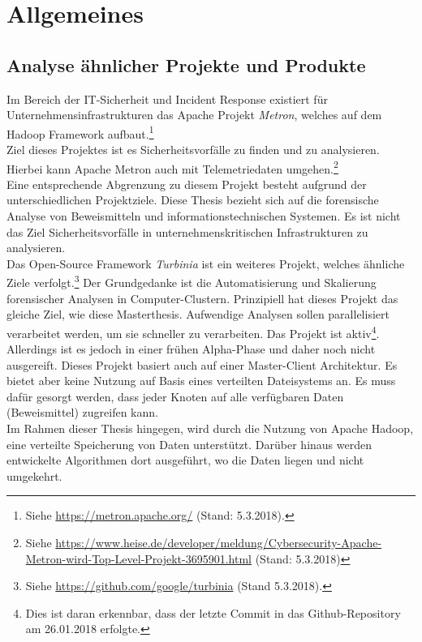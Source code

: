 \chapter{Allgemeines}

\section{Analyse ähnlicher Projekte und Produkte}
Im Bereich der IT-Sicherheit und Incident Response existiert für Unternehmensinfrastrukturen das Apache Projekt \textit{Metron}, welches auf dem Hadoop Framework aufbaut.\footnote{Siehe \url{https://metron.apache.org/} (Stand: 5.3.2018).}\\ Ziel dieses Projektes ist es Sicherheitsvorfälle zu finden und zu analysieren. Hierbei kann Apache Metron auch mit Telemetriedaten umgehen.\footnote{Siehe \url{https://www.heise.de/developer/meldung/Cybersecurity-Apache-Metron-wird-Top-Level-Projekt-3695901.html} (Stand: 5.3.2018)}\\
Eine entsprechende Abgrenzung zu diesem Projekt besteht aufgrund der unterschiedlichen Projektziele. Diese Thesis bezieht sich auf die forensische Analyse von Beweismitteln und informationstechnischen Systemen. Es ist nicht das Ziel Sicherheitsvorfälle in unternehmenskritischen Infrastrukturen zu analysieren.\\

\noindent
Das Open-Source Framework \textit{Turbinia} ist ein weiteres Projekt, welches ähnliche Ziele verfolgt.\footnote{Siehe \url{https://github.com/google/turbinia} (Stand 5.3.2018).}
Der Grundgedanke ist die Automatisierung und Skalierung forensischer Analysen in Computer-Clustern. Prinzipiell hat dieses Projekt das gleiche Ziel, wie diese Masterthesis. Aufwendige Analysen sollen parallelisiert  verarbeitet werden, um sie schneller zu verarbeiten. Das Projekt ist aktiv\footnote{Dies ist daran erkennbar, dass der letzte Commit in das Github-Repository am 26.01.2018 erfolgte.}. 
Allerdings ist es jedoch in einer frühen Alpha-Phase und daher noch nicht ausgereift. Dieses Projekt basiert auch auf einer Master-Client Architektur. Es bietet aber keine Nutzung auf Basis eines verteilten Dateisystems an. Es muss dafür gesorgt werden, dass jeder Knoten auf alle verfügbaren Daten (Beweismittel) zugreifen kann.\\  
Im Rahmen dieser Thesis hingegen, wird durch die Nutzung von Apache Hadoop, eine verteilte Speicherung von Daten unterstützt. Darüber hinaus werden entwickelte Algorithmen dort ausgeführt, wo die Daten liegen und nicht umgekehrt. \\


